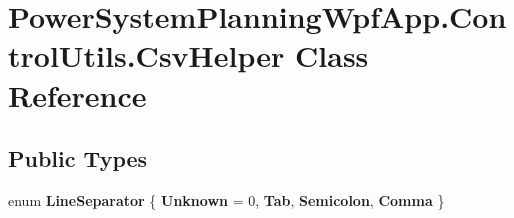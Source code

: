 \hypertarget{class_power_system_planning_wpf_app_1_1_control_utils_1_1_csv_helper}{}\section{Power\+System\+Planning\+Wpf\+App.\+Control\+Utils.\+Csv\+Helper Class Reference}
\label{class_power_system_planning_wpf_app_1_1_control_utils_1_1_csv_helper}
\subsection*{Public Types}
\begin{DoxyCompactItemize}
\item 
enum {\bfseries Line\+Separator} \{ {\bfseries Unknown} = 0, 
{\bfseries Tab}, 
{\bfseries Semicolon}, 
{\bfseries Comma}
 \}\hypertarget{class_power_system_planning_wpf_app_1_1_control_utils_1_1_csv_helper_a70691f6b3ee3b980dfcb2d789e705720}{}\label{class_power_system_planning_wpf_app_1_1_control_utils_1_1_csv_helper_a70691f6b3ee3b980dfcb2d789e705720}

\end{DoxyCompactItemize}

